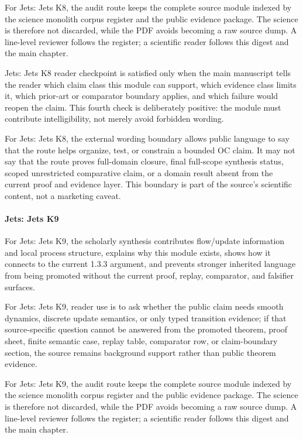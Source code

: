 For Jets: Jets K8, the audit route keeps the complete source module indexed by the science monolith corpus register and the public evidence package. The science is therefore not discarded, while the PDF avoids becoming a raw source dump. A line-level reviewer follows the register; a scientific reader follows this digest and the main chapter.


Jets: Jets K8 reader checkpoint is satisfied only when the main manuscript tells the reader which claim class this module can support, which evidence class limits it, which prior-art or comparator boundary applies, and which failure would reopen the claim. This fourth check is deliberately positive: the module must contribute intelligibility, not merely avoid forbidden wording.


For Jets: Jets K8, the external wording boundary allows public language to say that the route helps organize, test, or constrain a bounded OC claim. It may not say that the route proves full-domain closure, final full-scope synthesis status, scoped unrestricted comparative claim, or a domain result absent from the current proof and evidence layer. This boundary is part of the source's scientific content, not a marketing caveat.


\paragraph{Jets: Jets K9}

For Jets: Jets K9, the scholarly synthesis contributes flow/update information and local process structure, explains why this module exists, shows how it connects to the current 1.3.3 argument, and prevents stronger inherited language from being promoted without the current proof, replay, comparator, and falsifier surfaces.


For Jets: Jets K9, reader use is to ask whether the public claim needs smooth dynamics, discrete update semantics, or only typed transition evidence; if that source-specific question cannot be answered from the promoted theorem, proof sheet, finite semantic case, replay table, comparator row, or claim-boundary section, the source remains background support rather than public theorem evidence.


For Jets: Jets K9, the audit route keeps the complete source module indexed by the science monolith corpus register and the public evidence package. The science is therefore not discarded, while the PDF avoids becoming a raw source dump. A line-level reviewer follows the register; a scientific reader follows this digest and the main chapter.


